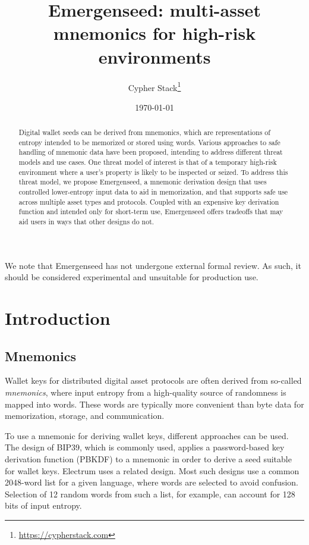 \documentclass{article}
\title{Emergenseed: multi-asset mnemonics for high-risk environments}
\author{Cypher Stack\thanks{\url{https://cypherstack.com}}}
\date{\today}
\begin{document}
\maketitle

\begin{abstract}
	Digital wallet seeds can be derived from mnemonics, which are representations of entropy intended to be memorized or stored using words.
	Various approaches to safe handling of mnemonic data have been proposed, intending to address different threat models and use cases.
	One threat model of interest is that of a temporary high-risk environment where a user's property is likely to be inspected or seized.
	To address this threat model, we propose Emergenseed, a mnemonic derivation design that uses controlled lower-entropy input data to aid in memorization, and that supports safe use across multiple asset types and protocols.
	Coupled with an expensive key derivation function and intended only for short-term use, Emergenseed offers tradeoffs that may aid users in ways that other designs do not.
\end{abstract}

We note that Emergenseed has not undergone external formal review.
As such, it should be considered experimental and unsuitable for production use.


\section{Introduction}

\subsection{Mnemonics}

Wallet keys for distributed digital asset protocols are often derived from so-called \textit{mnemonics}, where input entropy from a high-quality source of randomness is mapped into words.
These words are typically more convenient than byte data for memorization, storage, and communication.

To use a mnemonic for deriving wallet keys, different approaches can be used.
The design of BIP39, which is commonly used, applies a password-based key derivation function (PBKDF) to a mnemonic in order to derive a seed suitable for wallet keys.
Electrum uses a related design.
Most such designs use a common 2048-word list for a given language, where words are selected to avoid confusion.
Selection of 12 random words from such a list, for example, can account for 128 bits of input entropy.
\end{document}
